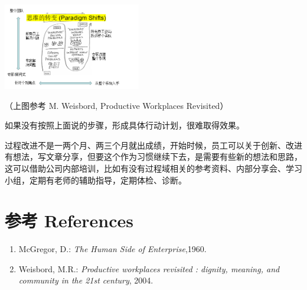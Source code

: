 
\includegraphics[width=6cm]{微信截图_20231025084623.png}

（上图参考 M. Weisbord, Productive Workplaces Revisited）

如果没有按照上面说的步骤，形成具体行动计划，很难取得效果。

过程改进不是一两个月、两三个月就出成绩，开始时候，员工可以关于创新、改进有想法，写文章分享，但要这个作为习惯继续下去，是需要有些新的想法和思路，这可以借助公司内部培训，比如有没有过程域相关的参考资料、内部分享会、学习小组，定期有老师的辅助指导，定期体检、诊断。


\hypertarget{ux9644ux4ef6}{%
\section{参考 References}\label{ux9644ux4ef6}}

\begin{enumerate}
\tightlist
\item
  McGregor, D.: \emph{The Human Side of Enterprise},1960.\\
\item
  Weisbord, M.R.: \emph{Productive workplaces revisited : dignity,
  meaning, and community in the 21st century}, 2004.
\end{enumerate}



